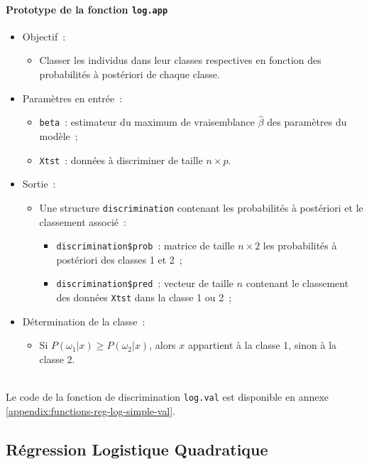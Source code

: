 \documentclass[a4paper,10pt]{report}
\begin{document}
\paragraph{Prototype de la fonction \texttt{log.app}}
\begin{itemize}
	\item Objectif~:
	\begin{itemize}
		\item Classer les individus dans leur classes respectives en fonction des probabilités à postériori de chaque classe.
	\end{itemize}
	
	\item Paramètres en entrée~:
	\begin{itemize}
		\item \texttt{beta}~: estimateur du maximum de vraisemblance $\hat{\beta}$ des paramètres du modèle~;
		\item \texttt{Xtst}~: données à discriminer de taille $n \times p$.
	\end{itemize}
	
	\item Sortie~:
	\begin{itemize}
		\item Une structure \texttt{discrimination} contenant les probabilités à postériori et le classement associé~:
		\begin{itemize}
			\item \texttt{discrimination\$prob}~: matrice de taille $n \times 2$ les probabilités à postériori des classes 1 et 2~;
			\item \texttt{discrimination\$pred}~: vecteur de taille $n$ contenant le classement des données \texttt{Xtst} dans la classe 1 ou 2~;
		\end{itemize}
	\end{itemize}
	\item Détermination de la classe~:
	\begin{itemize}
		\item Si $P(\omega_1|x) \geq P(\omega_2|x)$, alors $x$ appartient à la classe 1, sinon à la classe 2.
	\end{itemize}
\end{itemize}

~\\
Le code de la fonction de discrimination \texttt{log.val} est disponible en annexe \ref{appendix:functions-reg-log-simple-val}.


\subsection{Régression Logistique Quadratique}
\end{document}

